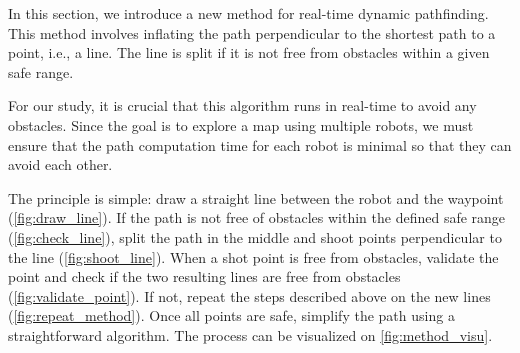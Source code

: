 \documentclass[../main.tex]{subfiles}
\begin{document}
In this section, we introduce a new method for real-time dynamic pathfinding. This method involves inflating the path perpendicular to the shortest path to a point, i.e., a line. The line is split if it is not free from obstacles within a given safe range.

For our study, it is crucial that this algorithm runs in real-time to avoid any obstacles. Since the goal is to explore a map using multiple robots, we must ensure that the path computation time for each robot is minimal so that they can avoid each other.  

The principle is simple: draw a straight line between the robot and the waypoint (\autoref{fig:draw_line}). If the path is not free of obstacles within the defined safe range (\autoref{fig:check_line}), split the path in the middle and shoot points perpendicular to the line (\autoref{fig:shoot_line}). When a shot point is free from obstacles, validate the point and check if the two resulting lines are free from obstacles (\autoref{fig:validate_point}). If not, repeat the steps described above on the new lines (\autoref{fig:repeat_method}). Once all points are safe, simplify the path using a straightforward algorithm. The process can be visualized on \autoref{fig:method_visu}.
\end{document}
